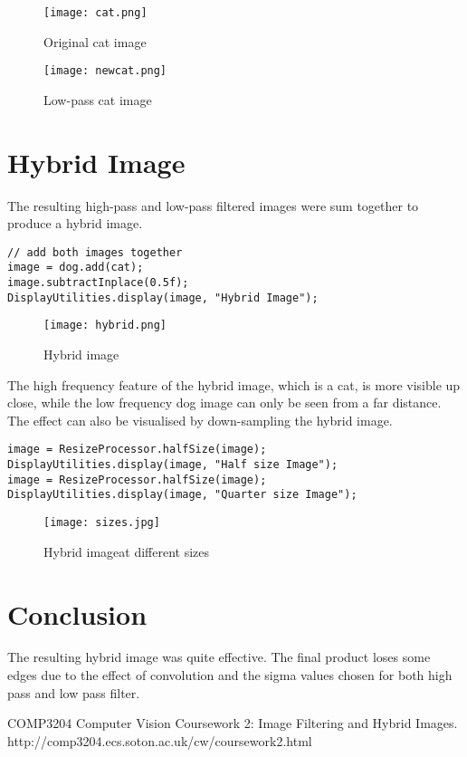 \documentclass[journal]{IEEEtran}
\begin{document}
\begin{figure}[!htb]
\centering
\texttt{[image: cat.png]}
\caption{Original cat image}
\end{figure}

\begin{figure}[!htb]
\centering
\texttt{[image: newcat.png]}
\caption{Low-pass cat image}
\end{figure}

\section{Hybrid Image}

The resulting high-pass and low-pass filtered images were sum together to produce a hybrid image. 

\begin{lstlisting}
// add both images together
image = dog.add(cat);
image.subtractInplace(0.5f);
DisplayUtilities.display(image, "Hybrid Image");
\end{lstlisting}

\begin{figure}[!htb]
\centering
\texttt{[image: hybrid.png]}
\caption{Hybrid image}
\end{figure}

The high frequency feature of the hybrid image, which is a cat, is more visible up close, while the low frequency dog image can only be seen from a far distance. The effect can also be visualised by down-sampling the hybrid image.

\begin{lstlisting}
image = ResizeProcessor.halfSize(image);
DisplayUtilities.display(image, "Half size Image");
image = ResizeProcessor.halfSize(image);
DisplayUtilities.display(image, "Quarter size Image");
\end{lstlisting}

\begin{figure}[!htb]
\centering
\texttt{[image: sizes.jpg]}
\caption{Hybrid imageat different sizes}
\end{figure}

\section{Conclusion}

The resulting hybrid image was quite effective. The final product loses some edges due to the effect of convolution and the sigma values chosen for both high pass and low pass filter.

\begin{thebibliography}{1}

COMP3204 Computer Vision Coursework 2: Image Filtering and Hybrid Images. http://comp3204.ecs.soton.ac.uk/cw/coursework2.html

\end{thebibliography}
\end{document}
